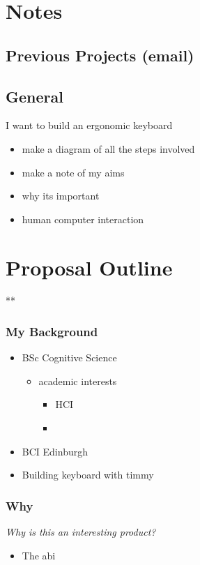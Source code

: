\documentclass[11pt]{article}
\begin{document}
\section{Notes}
\label{sec:org7bb1cdd}
\subsection{Previous Projects (email)}
\label{sec:org30081e5}
\subsection{General}
\label{sec:org4aa83e7}
I want to build an ergonomic keyboard
\begin{itemize}
\item make a diagram of all the steps involved
\item make a note of my aims
\item why its important
\item human computer interaction
\end{itemize}

\section{Proposal Outline}
\label{sec:orgc1161a8}
**
\subsubsection{My Background}
\label{sec:orgbd80591}
\begin{itemize}
\item BSc Cognitive Science
\begin{itemize}
\item academic interests
\begin{itemize}
\item HCI
\item 
\end{itemize}
\end{itemize}
\item BCI Edinburgh
\item Building keyboard with timmy
\end{itemize}
\subsubsection{Why}
\label{sec:org8d0c272}
\emph{Why is this an interesting product?}
\begin{itemize}
\item The abi
\end{itemize}
\end{document}
